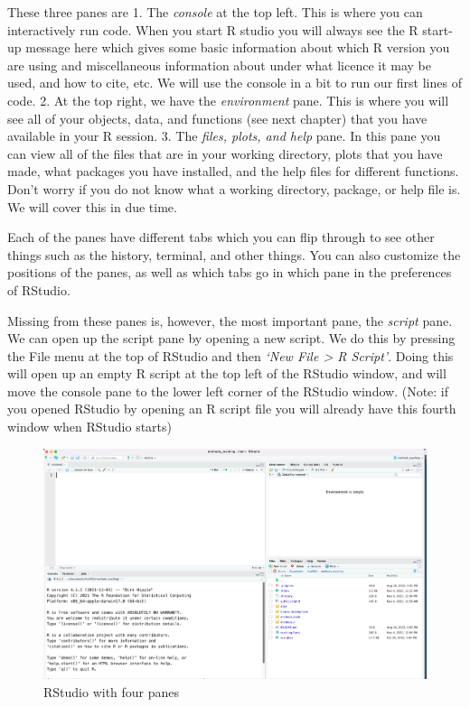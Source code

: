 \documentclass[
]{book}
\begin{document}
These three panes are
1. The \emph{console} at the top left. This is where you can interactively run code. When you start R studio you will always see the R start-up message here which gives some basic information about which R version you are using and miscellaneous information about under what licence it may be used, and how to cite, etc. We will use the console in a bit to run our first lines of code.
2. At the top right, we have the \emph{environment} pane. This is where you will see all of your objects, data, and functions (see next chapter) that you have available in your R session.
3. The \emph{files, plots, and help} pane. In this pane you can view all of the files that are in your working directory, plots that you have made, what packages you have installed, and the help files for different functions. Don't worry if you do not know what a working directory, package, or help file is. We will cover this in due time.

Each of the panes have different tabs which you can flip through to see other things such as the history, terminal, and other things. You can also customize the positions of the panes, as well as which tabs go in which pane in the preferences of RStudio.

Missing from these panes is, however, the most important pane, the \emph{script} pane. We can open up the script pane by opening a new script. We do this by pressing the File menu at the top of RStudio and then \emph{`New File \textgreater{} R Script'}. Doing this will open up an empty R script at the top left of the RStudio window, and will move the console pane to the lower left corner of the RStudio window. (Note: if you opened RStudio by opening an R script file you will already have this fourth window when RStudio starts)

\begin{figure}
\centering
\includegraphics{figures/script_pane.png}
\caption{RStudio with four panes}
\end{figure}
\end{document}

